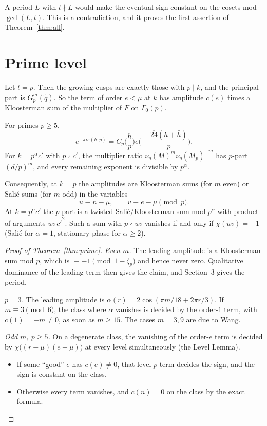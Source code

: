 \documentclass[11pt]{amsart}
\begin{document}
A period $L$ with $t\nmid L$ would make the eventual sign constant on the cosets mod $\gcd(L,t)$. This is a contradiction, and it proves the first assertion of Theorem~\ref{thm:all}.

\section{Prime level}
Let $t=p$. Then the growing cusps are exactly those with $p\mid k$, and the principal part is $G_p^m(\tilde q)$. So the term of order $e<\mu$ at $k$ has amplitude $c(e)$ times a Kloosterman sum of the multiplier of $F$ on $\Gamma_0(p)$.

\begin{lemma}
For primes $p\ge5$,
\[
e^{-\pi is(h,p)}=C_p\Big(\frac hp\Big)e\Big(-\frac{\overline{24}(h+\bar h)}{p}\Big).
\]
For $k=p^\alpha c'$ with $p\nmid c'$, the multiplier ratio $\nu_\eta(M)^m\nu_\eta(M_p)^{-m}$ has $p$-part $(d/p)^m$, and every remaining exponent is divisible by $p^\alpha$.
\end{lemma}

Consequently, at $k=p$ the amplitudes are Kloosterman sums (for $m$ even) or Sali\'e sums (for $m$ odd) in the variables
\[
u\equiv n-\mu,\qquad v\equiv e-\mu\pmod p .
\]
At $k=p^\alpha c'$ the $p$-part is a twisted Sali\'e/Kloosterman sum mod $p^\alpha$ with product of arguments $uv\,\overline{c'}^2$. Such a sum with $p\nmid uv$ vanishes if and only if $\chi(uv)=-1$ (Sali\'e for $\alpha=1$, stationary phase for $\alpha\ge2$).

\begin{proof}[Proof of Theorem~\ref{thm:prime}]
\emph{Even $m$.} The leading amplitude is a Kloosterman sum mod $p$, which is $\equiv-1\pmod{1-\zeta_p}$ and hence never zero. Qualitative dominance of the leading term then gives the claim, and Section~3 gives the period.

\emph{$p=3$.} The leading amplitude is $\alpha(r)=2\cos(\pi m/18+2\pi r/3)$. If $m\equiv3\pmod6$, the class where $\alpha$ vanishes is decided by the order-$1$ term, with $c(1)=-m\neq0$, as soon as $m\ge15$. The cases $m=3,9$ are due to Wang.

\emph{Odd $m$, $p\ge5$.} On a degenerate class, the vanishing of the order-$e$ term is decided by $\chi\big((r-\mu)(e-\mu)\big)$ at every level simultaneously (the Level Lemma).
\begin{itemize}[leftmargin=1.5em]
\item If some ``good'' $e$ has $c(e)\neq0$, that level-$p$ term decides the sign, and the sign is constant on the class.
\item Otherwise every term vanishes, and $c(n)=0$ on the class by the exact formula.
\end{itemize}
\end{proof}
\end{document}
